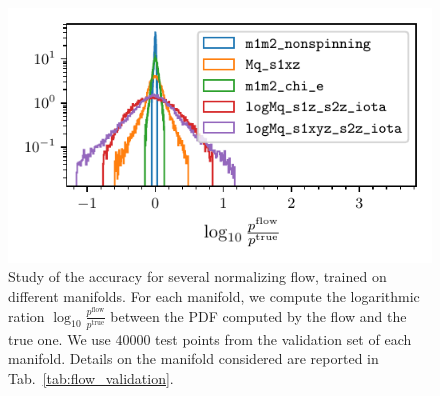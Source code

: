 \documentclass[twocolumn,showpacs,preprintnumbers,nofootinbib,prd,
superscriptaddress,10pt]{revtex4-2}
\begin{document}
\begin{figure}[t]
	\centering
	\includegraphics[scale = 1.]{flow_validation}
	\caption{Study of the accuracy for several normalizing flow, trained on different manifolds. For each manifold, we compute the logarithmic ration $\log_{10}\frac{p^\mathrm{flow}}{p^\mathrm{true}}$ between the PDF computed by the flow and the true one. We use $40000$ test points from the validation set of each manifold. Details on the manifold considered are reported in Tab.~\ref{tab:flow_validation}.}
	\label{fig:flow_validation}
\end{figure}
\end{document}
